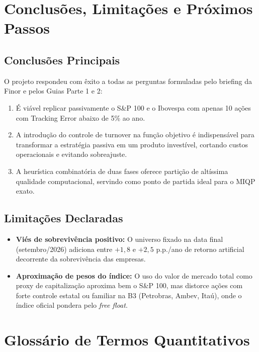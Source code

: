 \documentclass[11pt,a4paper]{article}
\begin{document}
\section{Conclusões, Limitações e Próximos Passos}

\subsection{Conclusões Principais}
O projeto respondeu com êxito a todas as perguntas formuladas pelo briefing da Finor e pelos Guias Parte 1 e 2:
\begin{enumerate}
    \item É viável replicar passivamente o S\&P 100 e o Ibovespa com apenas 10 ações com Tracking Error abaixo de 5\% ao ano.
    \item A introdução do controle de turnover na função objetivo é indispensável para transformar a estratégia passiva em um produto investível, cortando custos operacionais e evitando sobreajuste.
    \item A heurística combinatória de duas fases oferece partição de altíssima qualidade computacional, servindo como ponto de partida ideal para o MIQP exato.
\end{enumerate}

\subsection{Limitações Declaradas}
\begin{itemize}[leftmargin=*]
    \item \textbf{Viés de sobrevivência positivo:} O universo fixado na data final (setembro/2026) adiciona entre $+1,8$ e $+2,5$ p.p./ano de retorno artificial decorrente da sobrevivência das empresas.
    \item \textbf{Aproximação de pesos do índice:} O uso do valor de mercado total como proxy de capitalização aproxima bem o S\&P 100, mas distorce ações com forte controle estatal ou familiar na B3 (Petrobras, Ambev, Itaú), onde o índice oficial pondera pelo \textit{free float}.
\end{itemize}

\newpage
\section{Glossário de Termos Quantitativos}
\end{document}
